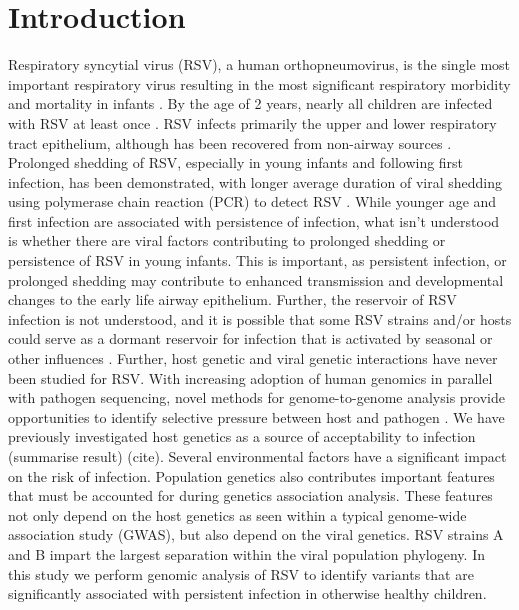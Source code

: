 \documentclass{article}
\begin{document}
\section{Introduction}
Respiratory syncytial virus (RSV), a human orthopneumovirus, is the single most important respiratory virus resulting in the most significant respiratory morbidity and mortality in infants 
\cite{hall_burden_2009}.
By the age of 2 years, nearly all children are infected with RSV at least once 
\cite{glezen_risk_1986}.
RSV infects primarily the upper and lower respiratory tract epithelium, although has been recovered from non-airway sources 
\cite{bokun_respiratory_2019,
cubie_detection_1997,
nadal_isolation_1990,
odonnell_respiratory_1998,
rezaee_respiratory_2011,
rohwedder_detection_1998}.
Prolonged shedding of RSV, especially in young infants and following first infection, has been demonstrated, with longer average duration of viral shedding using polymerase chain reaction (PCR) to detect RSV 
\cite{munywoki_influence_2015}.
While younger age and first infection are associated with persistence of infection, what isn't understood is whether there are viral factors contributing to prolonged shedding or persistence of RSV in young infants. 
This is important, as persistent infection, or prolonged shedding may contribute to enhanced transmission and developmental changes to the early life  airway epithelium. 
Further, the reservoir of RSV infection is not understood, 
and it is possible that some RSV strains and/or hosts could serve as a dormant reservoir for infection that is activated by seasonal or other influences 
\cite{hobson_persistent_2008}.
Further, host genetic and viral genetic interactions have never been studied for RSV.
With increasing adoption of human genomics in parallel with pathogen sequencing, novel methods for genome-to-genome analysis provide opportunities to identify selective pressure between host and pathogen \cite{naret2018correcting}.
We have previously investigated host genetics as a source of acceptability to infection (summarise result) (cite).
Several environmental factors have a significant impact on the risk of infection. 
Population genetics also contributes important features that must be accounted for during genetics association analysis. 
These features not only depend on the host genetics as seen within a typical genome-wide association study (GWAS), but also depend on the viral genetics.
RSV strains A and B impart the largest separation within the viral population phylogeny.
In this study we perform genomic analysis of RSV to identify variants that are significantly associated with persistent infection in otherwise healthy children.
\end{document}
